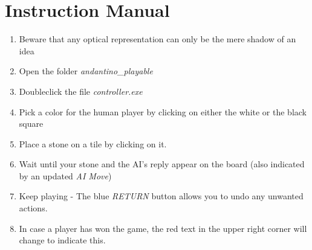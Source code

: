 \appendix
\section{Instruction Manual}


\begin{enumerate}
    \item Beware that any optical representation can only be the mere shadow of an idea
    \item Open the folder \textit{andantino\_playable}
    \item Doubleclick the file \textit{controller.exe}
    \item Pick a color for the  human player by clicking on either the white or the black square
    \item Place a stone on a tile by clicking on it.
    \item Wait until your stone and the AI's reply appear on the board (also indicated by an updated \textit{AI Move})
    \item Keep playing - The blue \textit{RETURN} button allows you to undo any unwanted actions.
    \item In case a player has won the game, the red text in the upper right corner will change to indicate this.
\end{enumerate}